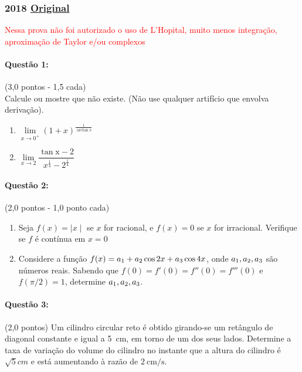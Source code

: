 \documentclass[12pt,a4paper]{article}
\newcommand{\original}[1]{\tiny \href{#1}{Original} \normalsize}
\begin{document}
\newpage

\subsubsection{2018 \original{}}

\textcolor{red}{Nessa prova não foi autorizado o uso de L'Hopital, muito menos integração, aproximação de Taylor e/ou complexos}

\paragraph{Questão 1: }(3,0 pontos - 1,5 cada) \\
Calcule ou mostre que não existe. (Não use qualquer artifício que envolva derivação).

\begin{enumerate}[label = (\alph*)]
\item $\lim \limits_{x \to 0^+} (1+x)^{\frac{1}{\arctan{x}}}$
\item $\lim \limits_{x \to 2} \dfrac{\mathrm{\tan {x - 2}}}{x^{\frac{1}{4}} - 2^{\frac{1}{4}}}$
\end{enumerate}

\paragraph{Questão 2:} (2,0 pontos - 1,0 ponto cada)

\begin{enumerate}[label = (\alph*)]
    \item Seja $f(x) = \mid x \mid $ se $x$ for racional, e $f(x) = 0 $ se $x$ for irracional. Verifique se $f$ é contínua em $x = 0$
    \item Considere a função $f(x) = a_{\textnormal{1}} + a_{\textnormal{2}} \cos{2x} + a_{\textnormal{3}} \cos{4x}$, onde $a_{\textnormal{1}}, a_{\textnormal{2}}, a_{\textnormal{3}}$ são números reais. Sabendo que $f(0) = f'(0) = f''(0) = f'''(0)$ e $f(\pi/2) = 1$, determine $a_{\textnormal{1}}, a_{\textnormal{2}}, a_{\textnormal{3}}$.
\end{enumerate}

\paragraph{Questão 3:}(2,0 pontos) Um cilindro circular reto é obtido girando-se um retângulo de diagonal constante e igual a \SI{5}{ \centi \meter}, em torno de um dos seus lados. Determine a taxa de variação do volume do cilindro no instante que a altura do cilindro é 
$\sqrt{5}cm$ 
e está aumentando à razão de $\SI{2}{\centi \meter \per \second}$.
\end{document}
